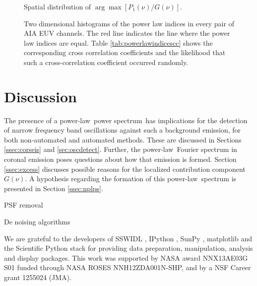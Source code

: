 \documentclass[onecolumn]{emulateapj}
\newcommand{\PS}{power spectrum}
\newcommand{\PL}{power-law}
\begin{document}
\begin{figure}
\label{fig:spatialdistribution:gaussianamplitude}

\caption{Spatial distribution of $\arg\max[P_{1}(\nu)/G(\nu)]$.}
\end{figure}



\begin{figure}
\label{fig:powerlawindicescc}

\caption{Two dimensional histograms of the power law indices in every
  pair of AIA EUV channels.  The red line indicates the line where the
  power law indices are equal. Table \ref{tab:powerlawindicescc} shows
the corresponding cross correlation coefficients and the likelihood
that such a cross-correlation coefficient occurred randomly.}
\end{figure}




\section{Discussion}\label{sec:discuss}
The presence of a \PL\ \PS\ has implications for the detection of
narrow frequency band oscillations against such a background emission,
for both non-automated and automated methods.  These are discussed in
Sections \ref{ssec:corseis} and \ref{sec:oscdetect}.  Further, the
\PL\ Fourier spectrum in coronal emission poses questions about how
that emission is formed.  Section \ref{ssec:excess} discusses possible
reasons for the localized contribution component $G(\nu)$.  A
hypothesis regarding the formation of this \PL\ spectrum is
presented in Section \ref{ssec:nplps}.

PSF removal

De noising algorithms




\acknowledgments
We are grateful to the developers of SSWIDL
\citep{1998SoPh..182..497F}, IPython \citep{ipython}, SunPy
\citep{mumford-proc-scipy-2013}, matplotlib
\citep{Hunter:2007} and the Scientific Python stack for providing data
preparation, manipulation, analysis and display packages.  This work
was supported by NASA award NNX13AE03G S01 funded through NASA ROSES
NNH12ZDA001N-SHP, and by a NSF Career grant 1255024 (JMA).
\end{document}
